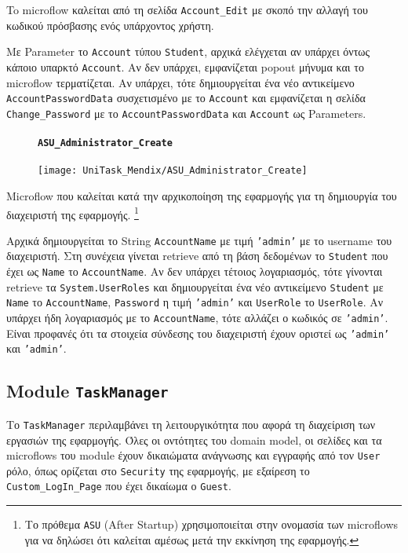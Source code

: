                     To microflow καλείται από τη σελίδα \texttt{Account\_Edit} με σκοπό την αλλαγή του κωδικού πρόσβασης ενός υπάρχοντος χρήστη.

                    Με Parameter το \texttt{Account} τύπου \texttt{Student}, αρχικά ελέγχεται αν υπάρχει όντως κάποιο υπαρκτό \texttt{Account}. Αν δεν υπάρχει, εμφανίζεται popout μήνυμα και το microflow τερματίζεται. Αν υπάρχει, τότε δημιουργείται ένα νέο αντικείμενο \texttt{AccountPasswordData} συσχετισμένο με το \texttt{Account} και εμφανίζεται η σελίδα \texttt{Change\_Password} με το \linebreak \texttt{AccountPasswordData} και \texttt{Account} ως Parameters.

                \begin{figure}[H] \noindent
                    \paragraph{\texttt{ASU\_Administrator\_Create}}
                    \begin{center}
                        \texttt{[image: UniTask\_Mendix/ASU\_Administrator\_Create]}
                    \end{center}
                \end{figure}

                    Microflow που καλείται κατά την αρχικοποίηση της εφαρμογής για τη δημιουργία του διαχειριστή της εφαρμογής. \footnote{Το πρόθεμα \texttt{ASU} (After Startup) χρησιμοποιείται στην ονομασία των microflows για να δηλώσει ότι καλείται αμέσως μετά την εκκίνηση της εφαρμογής.}

                    Αρχικά δημιουργείται το String \texttt{AccountName} με τιμή \texttt{'admin'} με το username του διαχειριστή. Στη συνέχεια γίνεται retrieve από τη βάση δεδομένων το \texttt{Student} που έχει ως \texttt{Name} το \texttt{AccountName}. Αν δεν υπάρχει τέτοιος λογαριασμός, τότε γίνονται retrieve τα \texttt{System.UserRoles} και δημιουργείται ένα νέο αντικείμενο \texttt{Student} με \texttt{Name} το \texttt{AccountName}, \texttt{Password} η τιμή \texttt{'admin'} και \texttt{UserRole} το \texttt{UserRole}. Αν υπάρχει ήδη λογαριασμός με το \texttt{AccountName}, τότε αλλάζει ο κωδικός σε \texttt{'admin'}. Είναι προφανές ότι τα στοιχεία σύνδεσης του διαχειριστή έχουν οριστεί ως \texttt{'admin'} και \texttt{'admin'}.

        \subsection{Module \texttt{TaskManager}}
            Το \texttt{TaskManager} περιλαμβάνει τη λειτουργικότητα που αφορά τη διαχείριση των εργασιών της εφαρμογής. Όλες οι οντότητες του domain model, οι σελίδες και τα microflows του module έχουν δικαιώματα ανάγνωσης και εγγραφής από τον \texttt{User} ρόλο, όπως ορίζεται στο \texttt{Security} της εφαρμογής, με εξαίρεση το \texttt{Custom\_LogIn\_Page} που έχει δικαίωμα ο \texttt{Guest}.

